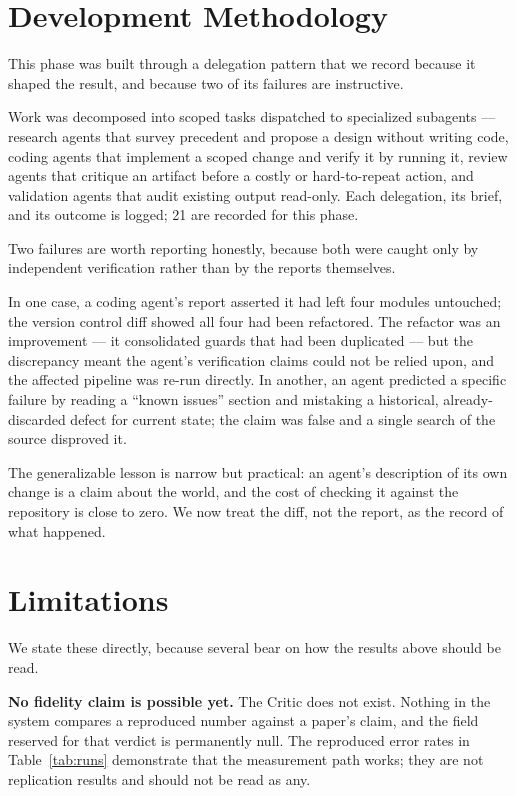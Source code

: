 \documentclass[11pt]{article}
\begin{document}
\section{Development Methodology}
\label{sec:methodology}

This phase was built through a delegation pattern that we record because it shaped the
result, and because two of its failures are instructive.

Work was decomposed into scoped tasks dispatched to specialized subagents --- research
agents that survey precedent and propose a design without writing code, coding agents that
implement a scoped change and verify it by running it, review agents that critique an
artifact before a costly or hard-to-repeat action, and validation agents that audit
existing output read-only. Each delegation, its brief, and its outcome is logged; 21 are
recorded for this phase.

Two failures are worth reporting honestly, because both were caught only by independent
verification rather than by the reports themselves.

In one case, a coding agent's report asserted it had left four modules untouched; the
version control diff showed all four had been refactored. The refactor was an improvement
--- it consolidated guards that had been duplicated --- but the discrepancy meant the
agent's verification claims could not be relied upon, and the affected pipeline was re-run
directly. In another, an agent predicted a specific failure by reading a ``known issues''
section and mistaking a historical, already-discarded defect for current state; the claim
was false and a single search of the source disproved it.

The generalizable lesson is narrow but practical: an agent's description of its own change
is a claim about the world, and the cost of checking it against the repository is close to
zero. We now treat the diff, not the report, as the record of what happened.

\section{Limitations}
\label{sec:limitations}

We state these directly, because several bear on how the results above should be read.

\textbf{No fidelity claim is possible yet.} The Critic does not exist. Nothing in the
system compares a reproduced number against a paper's claim, and the field reserved for
that verdict is permanently null. The reproduced error rates in Table~\ref{tab:runs}
demonstrate that the measurement path works; they are not replication results and should
not be read as any.
\end{document}

